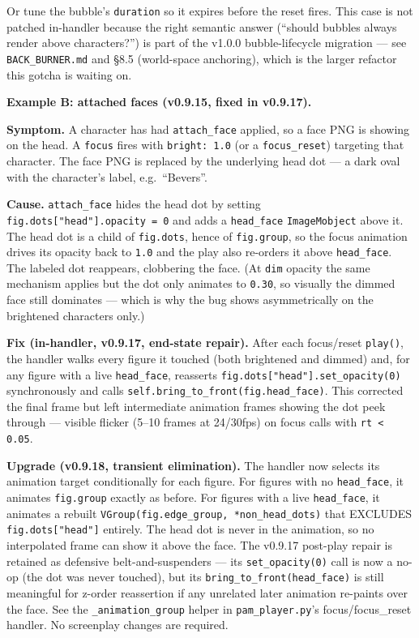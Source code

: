 \documentclass[
  11pt,
]{book}
\begin{document}
Or tune the bubble's \texttt{duration} so it expires before the reset
fires. This case is not patched in-handler because the right semantic
answer (``should bubbles always render above characters?'') is part of
the v1.0.0 bubble-lifecycle migration --- see
\texttt{BACK\_BURNER.md} and \S 8.5 (world-space anchoring), which is
the larger refactor this gotcha is waiting on.

\medskip

\textbf{Example B: attached faces (v0.9.15, fixed in v0.9.17).}

\textbf{Symptom.} A character has had \texttt{attach\_face} applied,
so a face PNG is showing on the head. A \texttt{focus} fires with
\texttt{bright:\ 1.0} (or a \texttt{focus\_reset}) targeting that
character. The face PNG is replaced by the underlying head dot --- a
dark oval with the character's label, e.g.\ ``Bevers''.

\textbf{Cause.} \texttt{attach\_face} hides the head dot by setting
\texttt{fig.dots["head"].opacity\ =\ 0} and adds a \texttt{head\_face}
\texttt{ImageMobject} above it. The head dot is a child of
\texttt{fig.dots}, hence of \texttt{fig.group}, so the focus
animation drives its opacity back to \texttt{1.0} and the play also
re-orders it above \texttt{head\_face}. The labeled dot reappears,
clobbering the face. (At \texttt{dim} opacity the same mechanism
applies but the dot only animates to \texttt{0.30}, so visually the
dimmed face still dominates --- which is why the bug shows
asymmetrically on the brightened characters only.)

\textbf{Fix (in-handler, v0.9.17, end-state repair).} After each
focus/reset \texttt{play()}, the handler walks every figure it touched
(both brightened and dimmed) and, for any figure with a live
\texttt{head\_face}, reasserts
\texttt{fig.dots["head"].set\_opacity(0)} synchronously and calls
\texttt{self.bring\_to\_front(fig.head\_face)}. This corrected the
final frame but left intermediate animation frames showing the dot
peek through --- visible flicker (5--10 frames at 24/30fps) on focus
calls with \texttt{rt < 0.05}.

\textbf{Upgrade (v0.9.18, transient elimination).} The handler now
selects its animation target conditionally for each figure. For
figures with no \texttt{head\_face}, it animates \texttt{fig.group}
exactly as before. For figures with a live \texttt{head\_face}, it
animates a rebuilt \texttt{VGroup(fig.edge\_group,\ *non\_head\_dots)}
that EXCLUDES \texttt{fig.dots["head"]} entirely. The head dot is
never in the animation, so no interpolated frame can show it above
the face. The v0.9.17 post-play repair is retained as defensive
belt-and-suspenders --- its \texttt{set\_opacity(0)} call is now a
no-op (the dot was never touched), but its
\texttt{bring\_to\_front(head\_face)} is still meaningful for z-order
reassertion if any unrelated later animation re-paints over the face.
See the \texttt{\_animation\_group} helper in
\texttt{pam\_player.py}'s focus/focus\_reset handler. No screenplay
changes are required.
\end{document}
